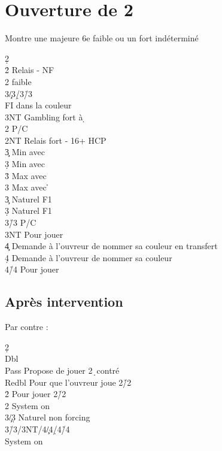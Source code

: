 \documentclass[a4paper]{article}
\begin{document}
\section{Ouverture de 2\pdfd}

Montre une majeure 6e faible ou un fort indéterminé

\begin{bidtable}
2\d\+\\
2\h \> Relais - NF\+\\
2\s \> faible\\
3\c/3\d/3\h/3\s\+\\
FI \> dans la couleur\-\\
3NT \> Gambling fort à \d \-\\
2\s \> P/C\\
2NT \> Relais fort - 16+ HCP\+\\
3\c \> Min avec \h \\
3\d \> Min avec \s \\
3\h \> Max avec \s \\
3\s \> Max avec \h \-\\
3\c \> Naturel F1\\
3\d \> Naturel F1\\
3\h/3\s \> P/C\\
3NT \> Pour jouer\\
4\c \> Demande à l'ouvreur de nommer sa couleur en transfert\\
4\d \> Demande à l'ouvreur de nommer sa couleur\\
4\h/4\s \> Pour jouer\-
\end{bidtable}

\subsection{Après intervention}

Par contre :

\begin{bidtable}
2\d\+\\
Dbl\+\\
Pass \> Propose de jouer 2\d\ contré\\
Redbl \> Pour que l'ouvreur joue 2\h /2\s \\
2\h \> Pour jouer 2\h /2\s \\
2\s \> System on\\
3\c/3\d \> Naturel non forcing\\
3\h/3\s/3NT/4\c/4\d/4\h/4\s\+\\
System \> on\-\-\-
\end{bidtable}
\end{document}

